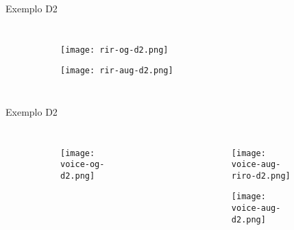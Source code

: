 \begin{frame}{Exemplo D2}
    \begin{columns}
        \begin{figure}
            \begin{subfigure}{\textwidth}
                \centering
                \texttt{[image: rir-og-d2.png]}
            \end{subfigure}
            \begin{subfigure}{\textwidth}
                \centering
                \texttt{[image: rir-aug-d2.png]}
            \end{subfigure}
        \end{figure}
    \end{columns}
        
\end{frame}

\begin{frame}{Exemplo D2}
    \begin{columns}
        \begin{figure}
            \begin{subfigure}{\textwidth}
                \centering
                \texttt{[image: voice-og-d2.png]}
            \end{subfigure}
        \end{figure}

        \begin{figure}
            \begin{subfigure}{\textwidth}
                \centering
                \texttt{[image: voice-aug-riro-d2.png]}
            \end{subfigure}
            \begin{subfigure}{\textwidth}
                \centering
                \texttt{[image: voice-aug-d2.png]}
            \end{subfigure}
        \end{figure}
    \end{columns}
\end{frame}

